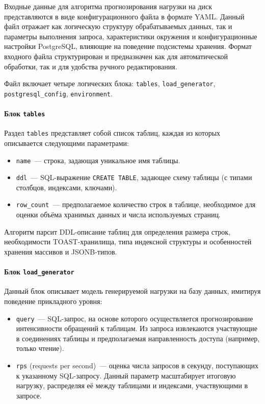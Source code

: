 Входные данные для алгоритма прогнозирования нагрузки на диск представляются в виде конфигурационного файла в формате YAML. 
Данный файл отражает как логическую структуру обрабатываемых данных, так и параметры выполнения запроса, характеристики окружения и конфигурационные настройки PostgreSQL, 
влияющие на поведение подсистемы хранения. Формат входного файла структурирован и предназначен как для автоматической обработки, так и для удобства ручного редактирования.

Файл включает четыре логических блока: \texttt{tables}, \texttt{load\_generator}, \texttt{postgresql\_config}, \texttt{environment}.

\paragraph{Блок \texttt{tables}}

Раздел \texttt{tables} представляет собой список таблиц, каждая из которых описывается следующими параметрами:

\begin{itemize}
  \item \texttt{name}~--- строка, задающая уникальное имя таблицы.
  \item \texttt{ddl}~--- SQL-выражение \texttt{CREATE TABLE}, задающее схему таблицы (с типами столбцов, индексами, ключами).
  \item \texttt{row\_count}~--- предполагаемое количество строк в таблице, необходимое для оценки объёма хранимых данных и числа используемых страниц.
\end{itemize}

Алгоритм парсит DDL-описание таблиц для определения размера строк, необходимости TOAST-хранилища, типа индексной структуры и особенностей хранения массивов и JSONB-типов.

\paragraph{Блок \texttt{load\_generator}}

Данный блок описывает модель генерируемой нагрузки на базу данных, имитируя поведение прикладного уровня:

\begin{itemize}
  \item \texttt{query}~--- SQL-запрос, на основе которого осуществляется прогнозирование интенсивности обращений к таблицам. Из запроса извлекаются участвующие в соединениях таблицы и предполагаемая направленность доступа (например, только чтение).
  \item \texttt{rps} (requests per second)~--- оценка числа запросов в секунду, поступающих к указанному SQL-запросу. Данный параметр масштабирует итоговую нагрузку, распределяя её между таблицами и индексами, участвующими в запросе.
\end{itemize}

